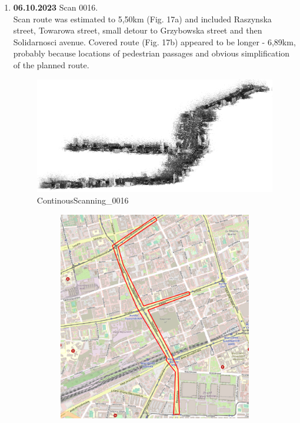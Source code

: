 \documentclass[a4paper,12pt]{book}
\begin{document}
\begin{enumerate}
	\item \textbf{06.10.2023} Scan 0016. \\
	Scan route was estimated to 5,50km (Fig. 17a) and included Raszynska street, Towarowa street, small detour to Grzybowska street and then Solidarnosci avenue. Covered route (Fig. 17b) appeared to be longer - 6,89km, probably because locations of pedestrian passages and obvious simplification of the planned route. 
	\begin{figure}[H]
		\includegraphics[width=1\linewidth]{cloud16}
		\caption{ContinousScanning\_0016}
	\end{figure}
	\begin{figure}[H]
		\centering
		\begin{subfigure}{.63\textwidth}
			\centering
			\includegraphics[width=1\linewidth]{route_p16}

\end{subfigure}
\end{figure}
\end{enumerate}
\end{document}
